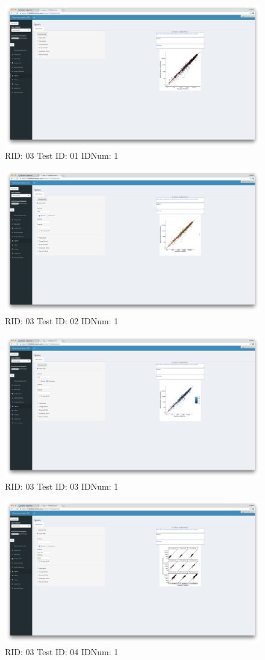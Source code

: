 \begin{figure}[H]
\includegraphics[width=.8\textwidth]{screencaps/03-01-1.png}
\caption{RID: 03 Test ID: 01 IDNum: 1}
\end{figure}
\begin{figure}[H]
\includegraphics[width=.8\textwidth]{screencaps/03-02-1.png}
\caption{RID: 03 Test ID: 02 IDNum: 1}
\end{figure}
\begin{figure}[H]
\includegraphics[width=.8\textwidth]{screencaps/03-03-1.png}
\caption{RID: 03 Test ID: 03 IDNum: 1}
\end{figure}
\begin{figure}[H]
\includegraphics[width=.8\textwidth]{screencaps/03-04-1.png}
\caption{RID: 03 Test ID: 04 IDNum: 1}
\end{figure}
